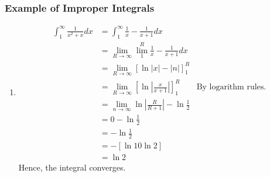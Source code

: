 \documentclass{article}
\begin{document}
\subsubsection{Example of Improper Integrals}
\begin{enumerate}
    \item \begin{align*}
        \int_1^\infty \frac{1}{x^2 + x} dx & = \int_1^\infty \frac{1}{x} - \frac{1}{x+1} dx\\
        & = \lim_{R\to\infty} \lim_1^R \frac{1}{x} - \frac{1}{x+1} dx\\
        & = \lim_{R\to\infty} \left[ \ln|x| - |n| \right]_1^R\\
        & = \lim_{R\to\infty} \left[ \ln|\frac{x}{x+1}|\right]_1^R & \text{By logarithm rules.}\\
        & = \lim_{n\to\infty} \ln |\frac{R}{R+1}| - \ln\frac{1}{2}\\
        & = 0 - \ln\frac{1}{2}\\
        & = -\ln \frac{1}{2}\\
        & = -[\ln 1 0 \ln 2]\\
        & = \ln 2
        \end{align*}
        Hence, the integral converges.
\end{enumerate}
\end{document}
